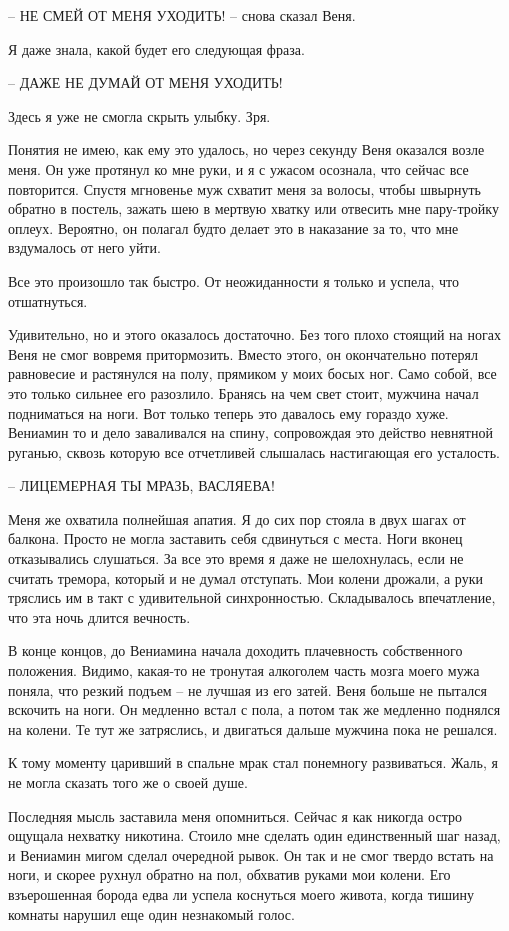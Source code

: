 \documentclass[
]{book}
\begin{document}
-- НЕ СМЕЙ ОТ МЕНЯ УХОДИТЬ! -- снова сказал Веня.

Я даже знала, какой будет его следующая фраза.

-- ДАЖЕ НЕ ДУМАЙ ОТ МЕНЯ УХОДИТЬ!

Здесь я уже не смогла скрыть улыбку. Зря.

Понятия не имею, как ему это удалось, но через секунду Веня оказался возле меня. Он уже протянул ко мне руки, и я с ужасом осознала, что сейчас все повторится. Спустя мгновенье муж схватит меня за волосы, чтобы швырнуть обратно в постель, зажать шею в мертвую хватку или отвесить мне пару-тройку оплеух. Вероятно, он полагал будто делает это в наказание за то, что мне вздумалось от него уйти.

Все это произошло так быстро. От неожиданности я только и успела, что отшатнуться.

Удивительно, но и этого оказалось достаточно. Без того плохо стоящий на ногах Веня не смог вовремя притормозить. Вместо этого, он окончательно потерял равновесие и растянулся на полу, прямиком у моих босых ног. Само собой, все это только сильнее его разозлило. Бранясь на чем свет стоит, мужчина начал подниматься на ноги. Вот только теперь это давалось ему гораздо хуже. Вениамин то и дело заваливался на спину, сопровождая это действо невнятной руганью, сквозь которую все отчетливей слышалась настигающая его усталость.

-- ЛИЦЕМЕРНАЯ ТЫ МРАЗЬ, ВАСЛЯЕВА!

Меня же охватила полнейшая апатия. Я до сих пор стояла в двух шагах от балкона. Просто не могла заставить себя сдвинуться с места. Ноги вконец отказывались слушаться. За все это время я даже не шелохнулась, если не считать тремора, который и не думал отступать. Мои колени дрожали, а руки тряслись им в такт с удивительной синхронностью. Складывалось впечатление, что эта ночь длится вечность.

В конце концов, до Вениамина начала доходить плачевность собственного положения. Видимо, какая-то не тронутая алкоголем часть мозга моего мужа поняла, что резкий подъем -- не лучшая из его затей. Веня больше не пытался вскочить на ноги. Он медленно встал с пола, а потом так же медленно поднялся на колени. Те тут же затряслись, и двигаться дальше мужчина пока не решался.

К тому моменту царивший в спальне мрак стал понемногу развиваться. Жаль, я не могла сказать того же о своей душе.

Последняя мысль заставила меня опомниться. Сейчас я как никогда остро ощущала нехватку никотина. Стоило мне сделать один единственный шаг назад, и Вениамин мигом сделал очередной рывок. Он так и не смог твердо встать на ноги, и скорее рухнул обратно на пол, обхватив руками мои колени. Его взъерошенная борода едва ли успела коснуться моего живота, когда тишину комнаты нарушил еще один незнакомый голос.
\end{document}
